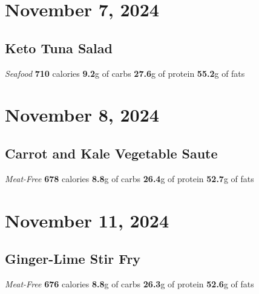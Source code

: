 \documentclass{article}%
\begin{document}
%
\section*{November 7, 2024}%
\label{sec:November7,2024}%
\begin{paracol}[1]{1}%
\sloppy%
\subsection*{Keto Tuna Salad}%
\label{subsec:KetoTunaSalad}%
\textit{Seafood}%
\newline%
\newline%
\textbf{710} calories%
\newline%
\textbf{9.2}g of carbs%
\newline%
\textbf{27.6}g of protein%
\newline%
\textbf{55.2}g of fats%
\newline%
\switchcolumn

%
\end{paracol}

%
\section*{November 8, 2024}%
\label{sec:November8,2024}%
\begin{paracol}[1]{1}%
\sloppy%
\subsection*{Carrot and Kale Vegetable Saute}%
\label{subsec:CarrotandKaleVegetableSaute}%
\textit{Meat{-}Free}%
\newline%
\newline%
\textbf{678} calories%
\newline%
\textbf{8.8}g of carbs%
\newline%
\textbf{26.4}g of protein%
\newline%
\textbf{52.7}g of fats%
\newline%
\switchcolumn

%
\end{paracol}

%
\section*{November 11, 2024}%
\label{sec:November11,2024}%
\begin{paracol}[1]{1}%
\sloppy%
\subsection*{Ginger{-}Lime Stir Fry}%
\label{subsec:Ginger{-}LimeStirFry}%
\textit{Meat{-}Free}%
\newline%
\newline%
\textbf{676} calories%
\newline%
\textbf{8.8}g of carbs%
\newline%
\textbf{26.3}g of protein%
\newline%
\textbf{52.6}g of fats%
\newline%
\switchcolumn

%
\end{paracol}
\end{document}

